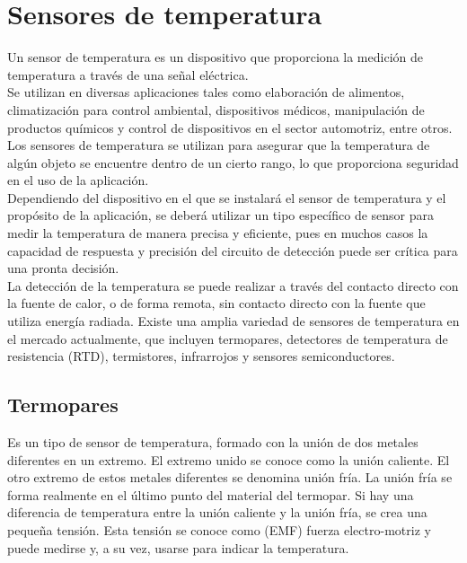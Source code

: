 	\section{Sensores de temperatura}
	Un sensor de temperatura es un dispositivo que proporciona la medición de temperatura a través de una señal eléctrica. \\
		
	Se utilizan en diversas aplicaciones tales como elaboración de alimentos, climatización para control ambiental, dispositivos médicos, manipulación de productos químicos y control de dispositivos en el sector automotriz, entre otros. \cite{trerice2001}\\
		
	Los sensores de temperatura se utilizan para asegurar que la temperatura de algún objeto se encuentre dentro de un cierto rango, lo que proporciona seguridad en el uso de la aplicación. \cite{maximTemp} \\
		
	Dependiendo del dispositivo en el que se instalará el sensor de temperatura y el propósito de la aplicación, se deberá utilizar un tipo específico de sensor para medir la temperatura de manera precisa y eficiente, pues en muchos casos la capacidad de respuesta y precisión del circuito de detección puede ser crítica para una pronta decisión. \\
	
	La detección de la temperatura se puede realizar a través del contacto directo con la fuente de calor, o de forma remota, sin contacto directo con la fuente que utiliza energía radiada. Existe una amplia variedad de sensores de temperatura en el mercado actualmente, que incluyen termopares, detectores de temperatura de resistencia (RTD), termistores, infrarrojos y sensores semiconductores. \cite{agarwalTemp} \\

	
	\subsection{Termopares}
	Es un tipo de sensor de temperatura, formado con la unión de dos metales diferentes en un extremo. El extremo unido se conoce como la unión caliente. El otro extremo de estos metales diferentes se denomina unión fría. La unión fría se forma realmente en el último punto del material del termopar. Si hay una diferencia de temperatura entre la unión caliente y la unión fría, se crea una pequeña tensión. Esta tensión se conoce como (EMF) fuerza electro-motriz y puede medirse y, a su vez, usarse para indicar la temperatura. \cite{davis2017} \\
	
